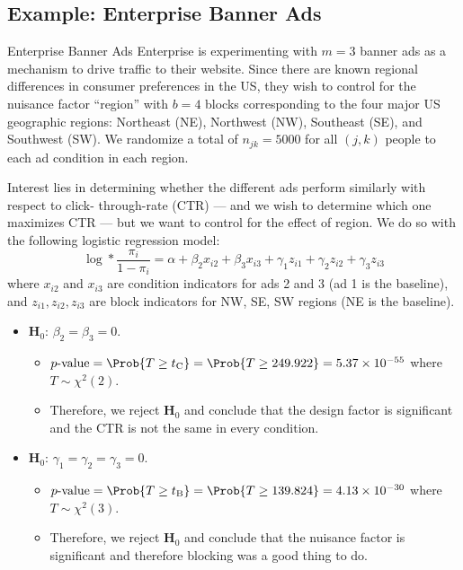 \subsection{Example: Enterprise Banner Ads}
\begin{Example}{Enterprise Banner Ads}{}
      Enterprise is experimenting with $m = 3$ banner ads as a mechanism to drive traffic to their website. Since
      there are known regional differences in consumer preferences in the US, they wish to control for the nuisance
      factor ``region'' with $b = 4$ blocks corresponding to the four major US geographic regions: Northeast (NE),
      Northwest (NW), Southeast (SE), and Southwest (SW). We randomize a total of $n_{jk} = 5000$ for all $ (j,k) $ people
      to each ad condition in each region.

      \vspace{2mm}

      Interest lies in determining whether the different ads perform similarly with respect to click-
      through-rate (CTR) --- and we wish to determine which one maximizes CTR --- but we want to control for
      the effect of region. We do so with the following logistic regression model:
      \[ \log*{\frac{\pi_i}{1-\pi_i}}=\alpha+\beta_2 x_{i2}+\beta_3 x_{i3}+\gamma_1 z_{i1}+\gamma_2 z_{i2}+\gamma_3 z_{i3} \]
      where $ x_{i2} $ and $ x_{i3} $ are condition indicators for ads 2 and 3 (ad 1 is the baseline),
      and $ z_{i1},z_{i2},z_{i3} $ are block indicators for NW, SE, SW regions (NE is the baseline).
      \begin{itemize}
            \item $ \mathbf{H}_0 $: $ \beta_2=\beta_3=0 $.
                  \begin{itemize}
                        \item $ p\text{-value}=\Prob{T\ge t_\text{C}}=\Prob{T\ge 249.922}=5.37\times 10^{-55} $ where $ T \sim \chi^2(2) $.
                        \item Therefore, we reject $ \mathbf{H}_0 $ and conclude that the design factor is significant and the CTR is not
                              the same in every condition.
                  \end{itemize}
            \item $ \mathbf{H}_0 $: $ \gamma_1=\gamma_2=\gamma_3=0 $.
                  \begin{itemize}
                        \item $ p\text{-value}=\Prob{T\ge t_\text{B}}=\Prob{T\ge 139.824}=4.13\times 10^{-30} $ where $ T \sim \chi^2(3) $.
                        \item Therefore, we reject $ \mathbf{H}_0 $ and conclude that the nuisance factor is significant
                              and therefore blocking was a good thing to do.
                  \end{itemize}
      \end{itemize}
\end{Example}
